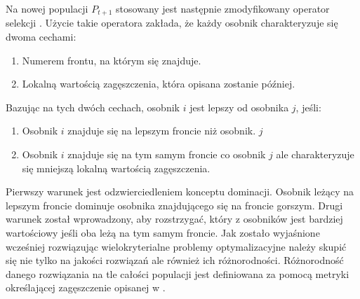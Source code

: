 \documentclass[twoside]{iisthesis}
\begin{document}
Na nowej populacji $P_{t+1}$ stosowany jest następnie zmodyfikowany operator selekcji \cite{nsga}. Użycie takie operatora zakłada, że każdy osobnik charakteryzuje się dwoma cechami:\\
\begin{enumerate}
	\item Numerem frontu, na którym się znajduje.
	\item Lokalną wartością zagęszczenia, która opisana zostanie później.\\
\end{enumerate}
Bazując na tych dwóch cechach, osobnik $i$ jest lepszy od osobnika $j$, jeśli:\\
\begin{enumerate}
	\item Osobnik $i$ znajduje się na lepszym froncie niż osobnik. $j$
	\item Osobnik $i$ znajduje się na tym samym froncie co osobnik $j$ ale charakteryzuje się mniejszą lokalną wartością zagęszczenia.\\
\end{enumerate}
Pierwszy warunek jest odzwierciedleniem konceptu dominacji. Osobnik leżący na lepszym froncie dominuje osobnika znajdującego się na froncie gorszym. Drugi warunek został wprowadzony, aby rozstrzygać, który z osobników jest bardziej wartościowy jeśli oba leżą na tym samym froncie. Jak zostało wyjaśnione wcześniej rozwiązując wielokryterialne problemy optymalizacyjne należy skupić się nie tylko na jakości rozwiązań ale również ich różnorodności. Różnorodność danego rozwiązania na tle całości populacji jest definiowana za pomocą metryki określającej zagęszczenie opisanej w \cite{book}. 
\end{document}

